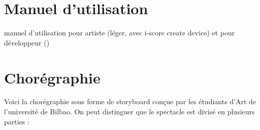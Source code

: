 \section{Manuel d'utilisation}
manuel d'utilisation pour artiste (léger, avec i-score create device) et pour développeur () 

\section{Chorégraphie}
Voici la chorégraphie sous forme de storyboard conçue par les étudiants d'Art de l'université de Bilbao. On peut distinguer que le spectacle est divisé en plusieurs parties : 


\hspace*{-2cm}

